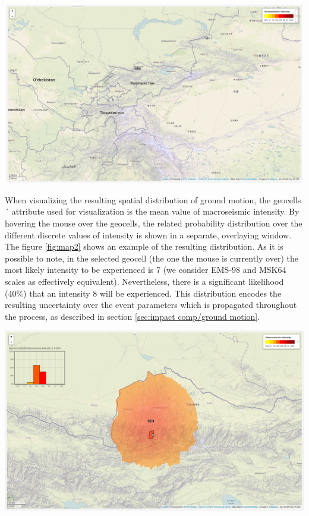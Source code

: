 \documentclass[12p]{article}
\begin{document}
\begin{center}
	\includegraphics[width=\textwidth]{map1}
\end{center}

When visualizing the resulting spatial distribution of ground motion, the
geocells´ attribute used for visualization is the mean value of macroseismic
intensity. By hovering the mouse over the geocells, the related probability
distribution over the different discrete values of intensity is shown in a
separate, overlaying window. The figure \ref{fig:map2} shows an example of
the resulting distribution. As it is possible to note, in the selected geocell (the
one the mouse is currently over) the most likely intensity to be experienced is
7 (we consider EMS-98 and MSK64 scales as effectively equivalent). Nevertheless,
there is a significant likelihood (40\%) that an intensity 8 will be
experienced. This distribution encodes the resulting uncertainty over the event
parameters which is propagated throughout the process, as described in section
\ref{sec:impact comp/ground motion}.

\begin{center}
	\includegraphics[width=\textwidth]{map2}
\end{center}
\end{document}
